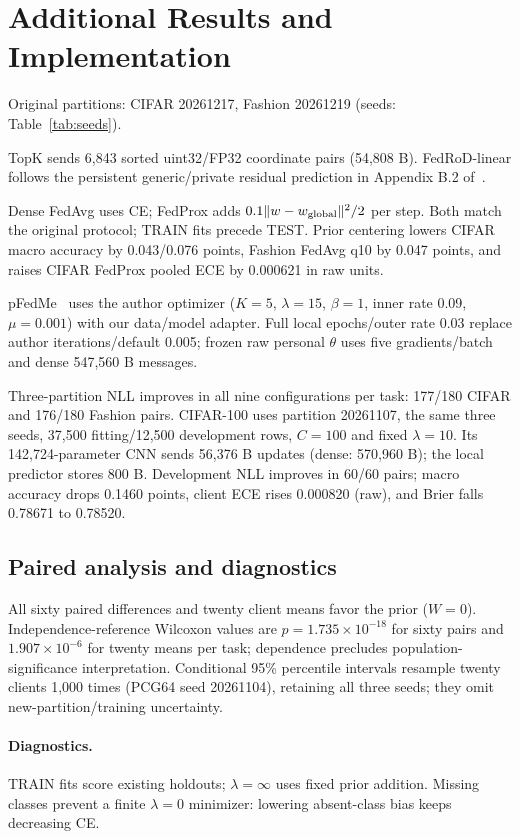 \appendix
\section{Additional Results and Implementation}\label{app:complete}

Original partitions: CIFAR 20261217, Fashion 20261219 (seeds: Table~\ref{tab:seeds}).



TopK sends 6,843 sorted uint32/FP32 coordinate pairs (54,808 B). FedRoD-linear follows the persistent generic/private residual prediction in Appendix B.2 of~\cite{chen2022fedrod}.

Dense FedAvg uses CE; FedProx adds $0.1\|w-w_{\rm global}\|^2/2$ per step. Both match the original protocol; TRAIN fits precede TEST. Prior centering lowers CIFAR macro accuracy by 0.043/0.076 points, Fashion FedAvg q10 by 0.047 points, and raises CIFAR FedProx pooled ECE by 0.000621 in raw units.

pFedMe~\cite{dinh2020pfedme} uses the author optimizer ($K=5$, $\lambda=15$, $\beta=1$, inner rate 0.09, $\mu=0.001$) with our data/model adapter. Full local epochs/outer rate 0.03 replace author iterations/default 0.005; frozen raw personal $\theta$ uses five gradients/batch and dense 547,560 B messages.

Three-partition NLL improves in all nine configurations per task: 177/180 CIFAR and 176/180 Fashion pairs. CIFAR-100 uses partition 20261107, the same three seeds, 37,500 fitting/12,500 development rows, $C=100$ and fixed $\lambda=10$. Its 142,724-parameter CNN sends 56,376 B updates (dense: 570,960 B); the local predictor stores 800 B. Development NLL improves in 60/60 pairs; macro accuracy drops 0.1460 points, client ECE rises 0.000820 (raw), and Brier falls 0.78671 to 0.78520.

\subsection*{Paired analysis and diagnostics}\label{app:statistics}
All sixty paired differences and twenty client means favor the prior ($W=0$). Independence-reference Wilcoxon values are $p=1.735\times10^{-18}$ for sixty pairs and $1.907\times10^{-6}$ for twenty means per task; dependence precludes population-significance interpretation. Conditional 95\% percentile intervals resample twenty clients 1,000 times (PCG64 seed 20261104), retaining all three seeds; they omit new-partition/training uncertainty.

\paragraph{Diagnostics.}\label{app:sensitivity}
TRAIN fits score existing holdouts; $\lambda=\infty$ uses fixed prior addition. Missing classes prevent a finite $\lambda=0$ minimizer: lowering absent-class bias keeps decreasing CE.

